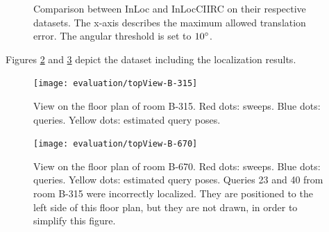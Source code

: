 \documentclass[twoside]{ctuthesis}
\theoremstyle{plain}
\theoremstyle{definition}
\theoremstyle{note}
\begin{document}
\begin{figure}
	\centering
	
	\caption{Comparison between InLoc and InLocCIIRC on their respective datasets. The x-axis describes the maximum allowed translation error. The angular threshold is set to $10\degree$.}
	\label{fig:dist-thresh-vs-accuracy}
\end{figure}

Figures \ref{fig:topView-B-315} and \ref{fig:topView-B-670} depict the dataset including the localization results.

\begin{figure}
	\centering
 	\texttt{[image: evaluation/topView-B-315]}
 	\caption{View on the floor plan of room B-315. Red dots: sweeps. Blue dots: queries. Yellow dots: estimated query poses.}
 	\label{fig:topView-B-315}
\end{figure} 

\begin{figure}
	\centering
 	\texttt{[image: evaluation/topView-B-670]}
 	\caption{View on the floor plan of room B-670. Red dots: sweeps. Blue dots: queries. Yellow dots: estimated query poses. Queries 23 and 40 from room B-315 were incorrectly localized. They are positioned to the left side of this floor plan, but they are not drawn, in order to simplify this figure.}
 	\label{fig:topView-B-670}
\end{figure} 

\appendix

\printindex

\appendix

%



\end{document}
